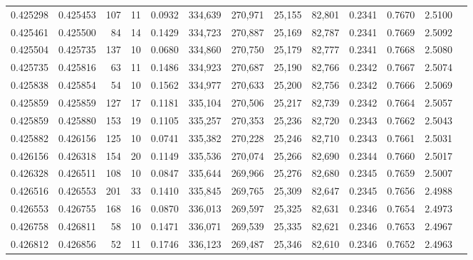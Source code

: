 \begin{tabular}{rrrrrrrrrrrrr}
0.425298 & 0.425453 &   107 &  11 &                                     0.0932 & 334,639 & 270,971 &  25,155 &  82,801 & 0.2341 & 0.7670 & 2.5100 \\
0.425461 & 0.425500 &    84 &  14 &                                     0.1429 & 334,723 & 270,887 &  25,169 &  82,787 & 0.2341 & 0.7669 & 2.5092 \\
0.425504 & 0.425735 &   137 &  10 &                                     0.0680 & 334,860 & 270,750 &  25,179 &  82,777 & 0.2341 & 0.7668 & 2.5080 \\
0.425735 & 0.425816 &    63 &  11 &                                     0.1486 & 334,923 & 270,687 &  25,190 &  82,766 & 0.2342 & 0.7667 & 2.5074 \\
0.425838 & 0.425854 &    54 &  10 &                                     0.1562 & 334,977 & 270,633 &  25,200 &  82,756 & 0.2342 & 0.7666 & 2.5069 \\
0.425859 & 0.425859 &   127 &  17 &                                     0.1181 & 335,104 & 270,506 &  25,217 &  82,739 & 0.2342 & 0.7664 & 2.5057 \\
0.425859 & 0.425880 &   153 &  19 &                                     0.1105 & 335,257 & 270,353 &  25,236 &  82,720 & 0.2343 & 0.7662 & 2.5043 \\
0.425882 & 0.426156 &   125 &  10 &                                     0.0741 & 335,382 & 270,228 &  25,246 &  82,710 & 0.2343 & 0.7661 & 2.5031 \\
0.426156 & 0.426318 &   154 &  20 &                                     0.1149 & 335,536 & 270,074 &  25,266 &  82,690 & 0.2344 & 0.7660 & 2.5017 \\
0.426328 & 0.426511 &   108 &  10 &                                     0.0847 & 335,644 & 269,966 &  25,276 &  82,680 & 0.2345 & 0.7659 & 2.5007 \\
0.426516 & 0.426553 &   201 &  33 &                                     0.1410 & 335,845 & 269,765 &  25,309 &  82,647 & 0.2345 & 0.7656 & 2.4988 \\
0.426553 & 0.426755 &   168 &  16 &                                     0.0870 & 336,013 & 269,597 &  25,325 &  82,631 & 0.2346 & 0.7654 & 2.4973 \\
0.426758 & 0.426811 &    58 &  10 &                                     0.1471 & 336,071 & 269,539 &  25,335 &  82,621 & 0.2346 & 0.7653 & 2.4967 \\
0.426812 & 0.426856 &    52 &  11 &                                     0.1746 & 336,123 & 269,487 &  25,346 &  82,610 & 0.2346 & 0.7652 & 2.4963 \\

\end{tabular}
